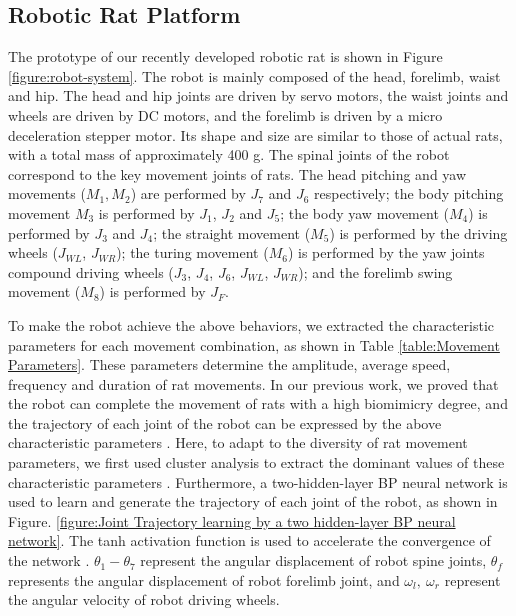 \subsection{Robotic Rat Platform}
The prototype of our recently developed robotic rat is shown in Figure
\ref{figure:robot-system}. The robot is mainly composed of the head, forelimb,
waist and hip. The head and hip joints are driven by servo motors, the waist
joints and wheels are driven by DC motors, and the forelimb is driven by a micro
deceleration stepper motor. Its shape and size are similar to those of actual
rats, with a total mass of approximately 400 g. The spinal joints of the robot
correspond to the key movement joints of rats. The head pitching and yaw
movements ($M_1, M_2$) are performed by $J_7$ and $J_6$ respectively; the body
pitching movement $M_3$ is performed by $J_1$, $J_2$ and $J_5$; the body yaw
movement ($M_4$) is performed by $J_3$ and $J_4$; the straight movement ($M_5$)
is performed by the driving wheels ($J_{WL}$, $J_{WR}$); the turing movement
($M_6$) is performed by the yaw joints compound driving wheels ($J_3$, $J_4$,
$J_6$, $J_{WL}$, $J_{WR}$); and the forelimb swing movement ($M_8$) is performed
by $J_F$.

To make the robot achieve the above behaviors, we extracted the characteristic
parameters for each movement combination, as shown in Table \ref{table:Movement
Parameters}. These parameters determine the amplitude, average speed, frequency
and duration of rat movements. In our previous work, we proved that the robot
can complete the movement of rats with a high biomimicry degree, and the
trajectory of each joint of the robot can be expressed by the above
characteristic parameters \cite{shi-gao-tro-2021}. Here, to adapt to the
diversity of rat movement parameters, we first used cluster analysis to extract
the dominant values of these characteristic parameters
\cite{fraley_how_many_clusters,kaufman_finding_groups}. Furthermore, a
two-hidden-layer BP neural network is used to learn and generate the trajectory
of each joint of the robot, as shown in Figure. \ref{figure:Joint Trajectory
learning by a two hidden-layer BP neural network}. The tanh activation function
is used to accelerate the convergence of the network
\cite{inohira-generalization}. $\theta_1-\theta_7$ represent the angular
displacement of robot spine joints, $\theta_f$ represents the angular
displacement of robot forelimb joint, and $\omega_l,~\omega_r$ represent the
angular velocity of robot driving wheels.

